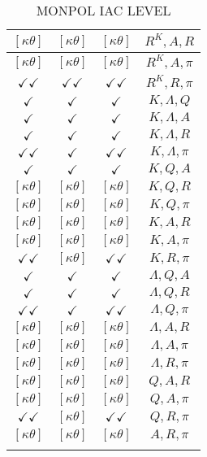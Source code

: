 \documentclass[a4paper,10pt]{article}
\begin{document}
\begin{longtable}{|c|c|c|c|}
\hline
$[\kappa \theta ]$ & $[\kappa \theta ]$ & $[\kappa \theta ]$ & ${R^{K}},{A},{R}$ \\
\hline
$[\kappa \theta ]$ & $[\kappa \theta ]$ & $[\kappa \theta ]$ & ${R^{K}},{A},{\pi}$ \\
\hline
$\checkmark\checkmark$ & $\checkmark\checkmark$ & $\checkmark\checkmark$ & ${R^{K}},{R},{\pi}$ \\
\hline
$\checkmark$ & $\checkmark$ & $\checkmark$ & ${K},{\Lambda},{Q}$ \\
\hline
$\checkmark$ & $\checkmark$ & $\checkmark$ & ${K},{\Lambda},{A}$ \\
\hline
$\checkmark$ & $\checkmark$ & $\checkmark$ & ${K},{\Lambda},{R}$ \\
\hline
$\checkmark\checkmark$ & $\checkmark$ & $\checkmark\checkmark$ & ${K},{\Lambda},{\pi}$ \\
\hline
$\checkmark$ & $\checkmark$ & $\checkmark$ & ${K},{Q},{A}$ \\
\hline
$[\kappa \theta ]$ & $[\kappa \theta ]$ & $[\kappa \theta ]$ & ${K},{Q},{R}$ \\
\hline
$[\kappa \theta ]$ & $[\kappa \theta ]$ & $[\kappa \theta ]$ & ${K},{Q},{\pi}$ \\
\hline
$[\kappa \theta ]$ & $[\kappa \theta ]$ & $[\kappa \theta ]$ & ${K},{A},{R}$ \\
\hline
$[\kappa \theta ]$ & $[\kappa \theta ]$ & $[\kappa \theta ]$ & ${K},{A},{\pi}$ \\
\hline
$\checkmark\checkmark$ & $[\kappa \theta ]$ & $\checkmark\checkmark$ & ${K},{R},{\pi}$ \\
\hline
$\checkmark$ & $\checkmark$ & $\checkmark$ & ${\Lambda},{Q},{A}$ \\
\hline
$\checkmark$ & $\checkmark$ & $\checkmark$ & ${\Lambda},{Q},{R}$ \\
\hline
$\checkmark\checkmark$ & $\checkmark$ & $\checkmark\checkmark$ & ${\Lambda},{Q},{\pi}$ \\
\hline
$[\kappa \theta ]$ & $[\kappa \theta ]$ & $[\kappa \theta ]$ & ${\Lambda},{A},{R}$ \\
\hline
$[\kappa \theta ]$ & $[\kappa \theta ]$ & $[\kappa \theta ]$ & ${\Lambda},{A},{\pi}$ \\
\hline
$[\kappa \theta ]$ & $[\kappa \theta ]$ & $[\kappa \theta ]$ & ${\Lambda},{R},{\pi}$ \\
\hline
$[\kappa \theta ]$ & $[\kappa \theta ]$ & $[\kappa \theta ]$ & ${Q},{A},{R}$ \\
\hline
$[\kappa \theta ]$ & $[\kappa \theta ]$ & $[\kappa \theta ]$ & ${Q},{A},{\pi}$ \\
\hline
$\checkmark\checkmark$ & $[\kappa \theta ]$ & $\checkmark\checkmark$ & ${Q},{R},{\pi}$ \\
\hline
$[\kappa \theta ]$ & $[\kappa \theta ]$ & $[\kappa \theta ]$ & ${A},{R},{\pi}$ \\
\hline
\caption{MONPOL IAC LEVEL}
\label{table:MyTableLabel}
\end{longtable}
\end{document}
